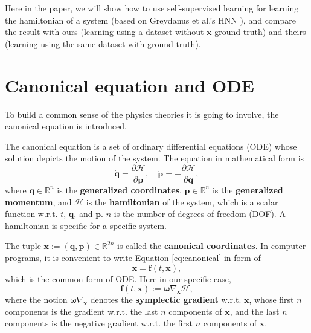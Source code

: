 \documentclass{article}
\begin{document}
Here in the paper, we will show how to use self-supervised learning for learning the hamiltonian of a system (based on Greydanus et al.'s HNN \cite{greydanus2019hamiltonian}),
and compare the result with ours (learning using a dataset without $\dot{\mathbf x}$ ground truth) and theirs (learning using the same dataset with ground truth).

\section{Canonical equation and ODE}

To build a common sense of the physics theories it is going to involve,
the canonical equation is introduced.

The canonical equation is a set of ordinary differential equations (ODE)
whose solution depicts the motion of the system.
The equation in mathematical form is \cite{hand2008mechanics}\cite[p. 65]{arnold1989mathmech}\cite[p. 132]{landau1976mechanics}
\begin{equation}
	\dot{\mathbf q}=\frac{\partial\mathcal H}{\partial\mathbf p},
	\quad
	\dot{\mathbf p}=-\frac{\partial\mathcal H}{\partial\mathbf q},
	\label{eq:canonical}
\end{equation}
where $\mathbf q\in\mathbb R^n$ is the \textbf{generalized coordinates},
$\mathbf p\in\mathbb R^n$ is the \textbf{generalized momentum},
and $\mathcal H$ is the \textbf{hamiltonian} of the system,
which is a scalar function w.r.t. $t$, $\mathbf q$, and $\mathbf p$.
$n$ is the number of degrees of freedom (DOF).
A hamiltonian is specific for a specific system.

The tuple $\mathbf x:=\left(\mathbf q,\mathbf p\right)\in\mathbb R^{2n}$
is called the \textbf{canonical coordinates}.
In computer programs, it is convenient to write Equation \ref{eq:canonical}
in form of
\begin{equation}
	\dot{\mathbf x}=\mathbf f\left(t,\mathbf x\right),
\end{equation}
which is the common form of ODE.
Here in our specific case,
\begin{equation}
	\mathbf f\left(t,\mathbf x\right):=\boldsymbol\omega\nabla_{\mathbf x}\mathcal H,
	\label{eq:ode}
\end{equation}
where the notion $\boldsymbol\omega\nabla_{\mathbf x}$ denotes the \textbf{symplectic gradient} w.r.t. $\mathbf x$,
whose first $n$ components is the gradient w.r.t. the last $n$ components of $\mathbf x$,
and the last $n$ components is the negative gradient w.r.t. the first $n$ components of $\mathbf x$.
\end{document}
